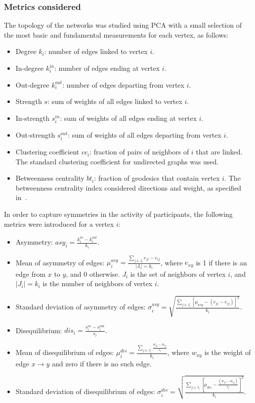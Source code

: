 \documentclass[%
	aip,
	jmp,%
	amsmath,amssymb,
	reprint,%
]{revtex4-1}
\begin{document}
\subsubsection{Metrics considered}\label{measures}

The topology of the networks was studied using PCA with a small selection of the most basic and fundamental measurements for each vertex, as follows:

\begin{itemize}
	\item Degree     $k_i$: number of edges linked to vertex $i$.
	\item In-degree  $k_i^{in}$: number of edges ending at vertex $i$.
	\item Out-degree $k_i^{out}$: number of edges departing from vertex $i$.
	\item Strength $s$: sum of weights of all edges linked to vertex $i$.
	\item In-strength $s_i^{in}$: sum of weights of all edges ending at vertex $i$.
	\item Out-strength $s_i^{out}$: sum of weights of all edges departing from vertex $i$.
	\item Clustering coefficient $cc_i$: fraction of pairs of neighbors of $i$ that are linked.  The standard clustering coefficient for undirected graphs was used.
	\item Betweenness centrality $bt_i$: fraction of geodesics that contain vertex $i$. The betweenness centrality index considered directions and weight, as specified in~\cite{faster}.
\end{itemize}

In order to capture symmetries in the activity of participants, the following metrics were introduced for a vertex $i$: 

\begin{itemize}
	\item Asymmetry: $asy_i=\frac{k_i^{in}-k_i^{out}}{k_i}$.
	\item Mean of asymmetry of edges: $\mu_i^{asy}=\frac{\sum_{j\in J_i} e_{ji}-e_{ij}}{|J_i|=k_i}$, where $e_{xy}$ is 1 if there is an edge from $x$ to $y$, and $0$ otherwise. $J_i$ is the set of neighbors of vertex $i$, and $|J_i|=k_i$ is the number of neighbors of vertex $i$.
	\item Standard deviation of asymmetry of edges: $\sigma_i^{asy}=\sqrt{\frac{\sum_{j\in J_i}[\mu_{asy} -(e_{ji}-e_{ij}) ]^2  }{k_i}  }$.
	\item Disequilibrium: $dis_i=\frac{s_i^{in}-s_i^{out}}{s_i}$.
	\item Mean of disequilibrium of edges: $\mu_i^{dis}=\frac{\sum_{j \in J_i}\frac{w_{ji}-w_{ij}}{s_i}}{k_i}$, where $w_{xy}$ is the weight of edge $x\rightarrow y$ and zero if there is no such edge.
	\item Standard deviation of disequilibrium of edges: $\sigma_i^{dis}=\sqrt{\frac{\sum_{j\in J_i}[\mu_{dis}-\frac{(w_{ji}-w_{ij})}{s_i}]^2}{k_i}}$.
\end{itemize}
\end{document}
